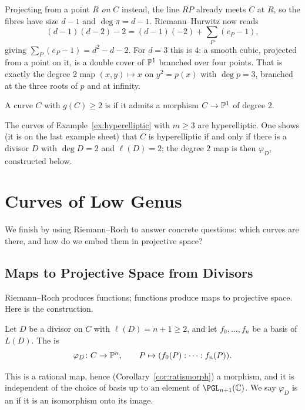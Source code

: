 \documentclass[a4paper]{scrartcl}
\begin{document}
\begin{example}
	Projecting from a point $R$ \emph{on} $C$ instead, the line $\overline{RP}$ already meets $C$ at $R$, so the fibres have size $d-1$ and $\deg\pi = d-1$. Riemann--Hurwitz now reads
	$$(d-1)(d-2)-2 = (d-1)(-2) + \sum_P(e_P-1),$$
	giving $\sum_P(e_P-1) = d^2 - d - 2$. For $d = 3$ this is $4$: a smooth cubic, projected from a point on it, is a double cover of $\mathbb{P}^1$ branched over four points. That is exactly the degree $2$ map $(x,y)\mapsto x$ on $y^2 = p(x)$ with $\deg p = 3$, branched at the three roots of $p$ and at infinity.
\end{example}

\begin{definition}
	A curve $C$ with $g(C)\geq 2$ is  if it admits a morphism $C \to \mathbb{P}^1$ of degree $2$.
\end{definition}

The curves of Example~\ref{ex:hyperelliptic} with $m \geq 3$ are hyperelliptic. One shows (it is on the last example sheet) that $C$ is hyperelliptic if and only if there is a divisor $D$ with $\deg D = 2$ and $\ell(D) = 2$; the degree $2$ map is then $\varphi_D$, constructed below.

\section{Curves of Low Genus}\label{sec:lowgenus}

We finish by using Riemann--Roch to answer concrete questions: which curves are there, and how do we embed them in projective space?

\subsection{Maps to Projective Space from Divisors}

Riemann--Roch produces functions; functions produce maps to projective space. Here is the construction.

\begin{definition}
	Let $D$ be a divisor on $C$ with $\ell(D) = n+1 \geq 2$, and let $f_0,\dots,f_n$ be a basis of $L(D)$. The  is
	$$\varphi_D \colon C \to \mathbb{P}^n, \qquad P \mapsto (f_0(P) : \cdots : f_n(P)).$$
\end{definition}

This is a rational map, hence (Corollary~\ref{cor:ratismorph}) a morphism, and it is independent of the choice of basis up to an element of $\PGL_{n+1}(\C)$. We say $\varphi_D$ is an  if it is an isomorphism onto its image.
\end{document}
